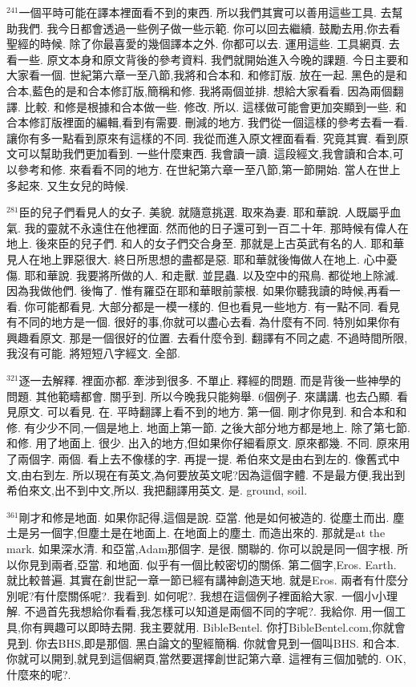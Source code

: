 \documentclass{book}
\begin{document}
$^{241}$一個平時可能在譯本裡面看不到的東西.
所以我們其實可以善用這些工具.
去幫助我們.
我今日都會透過一些例子做一些示範.
你可以回去繼續.
鼓勵去用,你去看聖經的時候.
除了你最喜愛的幾個譯本之外.
你都可以去.
運用這些.
工具網頁.
去看一些.
原文本身和原文背後的參考資料.
我們就開始進入今晚的課題.
今日主要和大家看一個.
世紀第六章一至八節,我將和合本和.
和修訂版.
放在一起.
黑色的是和合本,藍色的是和合本修訂版,簡稱和修.
我將兩個並排.
想給大家看看.
因為兩個翻譯.
比較.
和修是根據和合本做一些.
修改.
所以.
這樣做可能會更加突顯到一些.
和合本修訂版裡面的編輯,看到有需要.
刪減的地方.
我們從一個這樣的參考去看一看.
讓你有多一點看到原來有這樣的不同.
我從而進入原文裡面看看.
究竟其實.
看到原文可以幫助我們更加看到.
一些什麼東西.
我會讀一讀.
這段經文,我會讀和合本,可以參考和修.
來看看不同的地方.
在世紀第六章一至八節,第一節開始.
當人在世上多起來.
又生女兒的時候.

$^{281}$臣的兒子們看見人的女子.
美貌.
就隨意挑選.
取來為妻.
耶和華說.
人既屬乎血氣.
我的靈就不永遠住在他裡面.
然而他的日子還可到一百二十年.
那時候有偉人在地上.
後來臣的兒子們.
和人的女子們交合身至.
那就是上古英武有名的人.
耶和華見人在地上罪惡很大.
終日所思想的盡都是惡.
耶和華就後悔做人在地上.
心中憂傷.
耶和華說.
我要將所做的人.
和走獸.
並昆蟲.
以及空中的飛鳥.
都從地上除滅.
因為我做他們.
後悔了.
惟有羅亞在耶和華眼前蒙根.
如果你聽我讀的時候,再看一看.
你可能都看見.
大部分都是一模一樣的.
但也看見一些地方.
有一點不同.
看見有不同的地方是一個.
很好的事,你就可以盡心去看.
為什麼有不同.
特別如果你有興趣看原文.
那是一個很好的位置.
去看什麼令到.
翻譯有不同之處.
不過時間所限,我沒有可能.
將短短八字經文.
全部.

$^{321}$逐一去解釋.
裡面亦都.
牽涉到很多.
不單止.
釋經的問題.
而是背後一些神學的問題.
其他範疇都會.
關乎到.
所以今晚我只能夠舉.
6個例子.
來講講.
也去凸顯.
看見原文.
可以看見.
在.
平時翻譯上看不到的地方.
第一個.
剛才你見到.
和合本和和修.
有少少不同,一個是地上.
地面上第一節.
之後大部分地方都是地上.
除了第七節.
和修.
用了地面上.
很少.
出入的地方,但如果你仔細看原文.
原來都幾.
不同.
原來用了兩個字.
兩個.
看上去不像樣的字.
再提一提.
希伯來文是由右到左的.
像舊式中文,由右到左.
所以現在有英文,為何要放英文呢?因為這個字體.
不是最方便,我出到希伯來文,出不到中文,所以.
我把翻譯用英文.
是.
ground, soil.

$^{361}$剛才和修是地面.
如果你記得,這個是說.
亞當.
他是如何被造的.
從塵土而出.
塵土是另一個字,但塵土是在地面上.
在地面上的塵土.
而造出來的.
那就是at the mark.
如果深水清.
和亞當,Adam那個字.
是很.
關聯的.
你可以說是同一個字根.
所以你見到兩者,亞當.
和地面.
似乎有一個比較密切的關係.
第二個字,Eros.
Earth.
就比較普遍.
其實在創世記一章一節已經有講神創造天地.
就是Eros.
兩者有什麼分別呢?有什麼關係呢?.
我看到.
如何呢?.
我想在這個例子裡面給大家.
一個小小理解.
不過首先我想給你看看,我怎樣可以知道是兩個不同的字呢?.
我給你.
用一個工具,你有興趣可以即時去開.
我主要就用.
BibleBentel.
你打BibleBentel.com,你就會見到.
你去BHS,即是那個.
黑白論文的聖經簡稱.
你就會見到一個叫BHS.
和合本.
你就可以開到,就見到這個網頁,當然要選擇創世記第六章.
這裡有三個加號的.
OK,什麼來的呢?.
\end{document}
